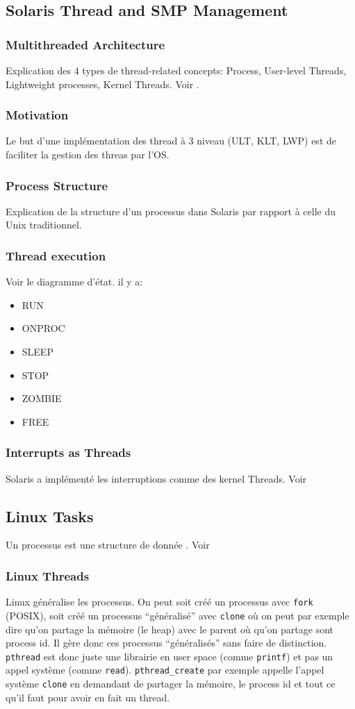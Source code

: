 \subsection{Solaris Thread and SMP Management }
\subsubsection{Multithreaded Architecture}
Explication des 4 types de thread-related concepts: Process, User-level Threads, Lightweight processes, Kernel Threads. Voir \cite[p.~202]{stallings}.
\subsubsection{Motivation}
Le but d'une implémentation des thread à 3 niveau (ULT, KLT, LWP) est de faciliter la gestion des threas par l'OS.
\subsubsection{Process Structure}
Explication de la structure d'un processus dans Solaris par rapport à celle du Unix traditionnel.
\subsubsection{Thread execution}
Voir le diagramme d'état. il y a:
\begin{itemize}
  \item RUN
  \item ONPROC
  \item SLEEP
  \item STOP
  \item ZOMBIE
  \item FREE
\end{itemize}
\subsubsection{Interrupts as Threads}
Solaris a implémenté les interruptions comme des kernel Threads. Voir \cite[p.~206]{stallings}

\subsection{Linux Tasks}
Un processus est une structure de donnée . Voir \cite[p.~207]{stallings}

\subsubsection{Linux Threads}
Linux généralise les processus.
On peut soit créé un processus avec \lstinline|fork| (POSIX),
soit créé un processus ``généralisé'' avec \lstinline|clone| où on peut par exemple dire
qu'on partage la mémoire (le heap) avec le parent où qu'on partage sont process id.
Il gère donc ces processus ``généralisés'' sans faire de distinction.
\lstinline|pthread| est donc juste une librairie en user space (comme \lstinline|printf|)
et pas un appel système (comme \lstinline|read|).
\lstinline|pthread_create| par exemple appelle l'appel système \lstinline|clone|
en demandant de partager la mémoire, le process id et tout ce qu'il faut
pour avoir en fait un thread.

